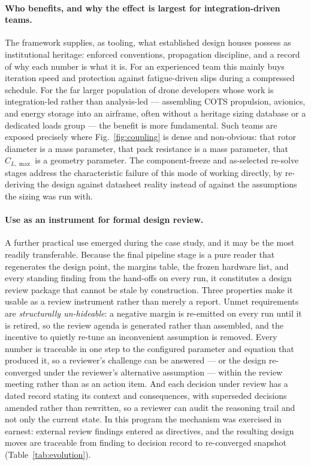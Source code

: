 \paragraph{Who benefits, and why the effect is largest for
integration-driven teams.} The framework supplies, as tooling, what
established design houses possess as institutional heritage:
enforced conventions, propagation discipline, and a record of why each
number is what it is. For an experienced team this mainly buys
iteration speed and protection against fatigue-driven slips during a
compressed schedule. For the far larger population of drone developers
whose work is integration-led rather than analysis-led --- assembling
COTS propulsion, avionics, and energy storage into an airframe, often
without a heritage sizing database or a dedicated loads group --- the
benefit is more fundamental. Such teams are exposed precisely where
Fig.~\ref{fig:coupling} is dense and non-obvious: that rotor diameter
is a mass parameter, that pack resistance is a mass parameter, that
$C_{L,\max}$ is a geometry parameter. The component-freeze and
as-selected re-solve stages address the characteristic failure of this
mode of working directly, by re-deriving the design against datasheet
reality instead of against the assumptions the sizing was run with.

\paragraph{Use as an instrument for formal design review.} A further
practical use emerged during the case study, and it may be the most
readily transferable. Because the final pipeline stage is a pure reader
that regenerates the design point, the margins table, the frozen
hardware list, and every standing finding from the hand-offs on every
run, it constitutes a design review package that cannot be stale by
construction. Three properties make it usable as a review instrument
rather than merely a report. Unmet requirements are \emph{structurally
un-hideable}: a negative margin is re-emitted on every run until it is
retired, so the review agenda is generated rather than assembled, and
the incentive to quietly re-tune an inconvenient assumption is removed.
Every number is traceable in one step to the configured parameter and
equation that produced it, so a reviewer's challenge can be answered ---
or the design re-converged under the reviewer's alternative assumption
--- within the review meeting rather than as an action item. And each
decision under review has a dated record stating its context and
consequences, with superseded decisions amended rather than rewritten,
so a reviewer can audit the reasoning trail and not only the current
state. In this program the mechanism was exercised in earnest: external
review findings entered as directives, and the resulting design moves
are traceable from finding to decision record to re-converged snapshot
(Table~\ref{tab:evolution}).

